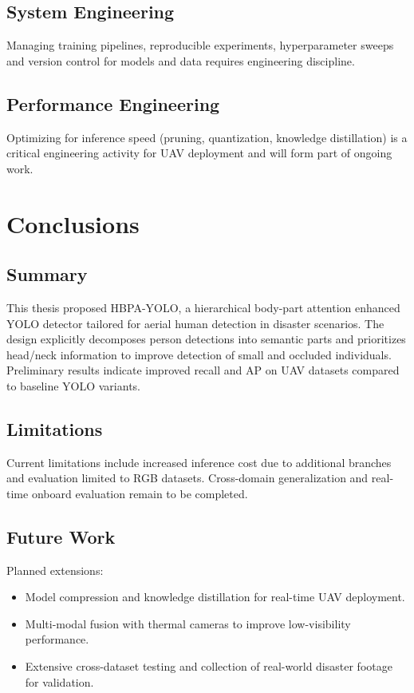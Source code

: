 \documentclass[12pt,a4paper]{report}
\begin{document}
\section{System Engineering}
Managing training pipelines, reproducible experiments, hyperparameter sweeps and version control for models and data requires engineering discipline.

\section{Performance Engineering}
Optimizing for inference speed (pruning, quantization, knowledge distillation) is a critical engineering activity for UAV deployment and will form part of ongoing work.


\chapter{Conclusions}

\section{Summary}
This thesis proposed HBPA-YOLO, a hierarchical body-part attention enhanced YOLO detector tailored for aerial human detection in disaster scenarios. The design explicitly decomposes person detections into semantic parts and prioritizes head/neck information to improve detection of small and occluded individuals. Preliminary results indicate improved recall and AP on UAV datasets compared to baseline YOLO variants.

\section{Limitations}
Current limitations include increased inference cost due to additional branches and evaluation limited to RGB datasets. Cross-domain generalization and real-time onboard evaluation remain to be completed.

\section{Future Work}
Planned extensions:
\begin{itemize}
  \item Model compression and knowledge distillation for real-time UAV deployment.
  \item Multi-modal fusion with thermal cameras to improve low-visibility performance.
  \item Extensive cross-dataset testing and collection of real-world disaster footage for validation.
\end{itemize}
\end{document}
